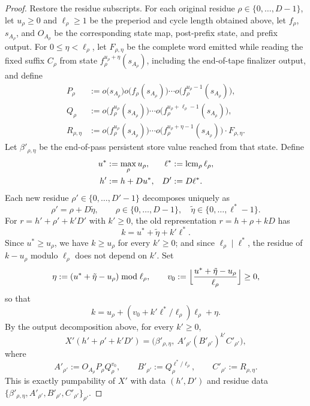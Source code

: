 \begin{proof}
Restore the residue subscripts. For each original residue
$\rho\in\{0,\ldots,D-1\}$, let $u_\rho\ge0$ and $\ell_\rho\ge1$ be the
preperiod and cycle length obtained above, let $f_\rho$, $s_{A_\rho}$, and
$O_{A_\rho}$ be the corresponding state map, post-prefix state, and prefix
output. For $0\le\eta<\ell_\rho$, let $F_{\rho,\eta}$ be the complete word
emitted while reading the fixed suffix $C_\rho$ from state
$f_\rho^{u_\rho+\eta}(s_{A_\rho})$, including the end-of-tape finalizer output,
and define
\begin{align*}
  P_\rho &:=
  o\bigl(s_{A_\rho}\bigr)o\bigl(f_\rho(s_{A_\rho})\bigr)\cdots
  o\bigl(f_\rho^{u_\rho-1}(s_{A_\rho})\bigr),\\
  Q_\rho &:=
  o\bigl(f_\rho^{u_\rho}(s_{A_\rho})\bigr)\cdots
  o\bigl(f_\rho^{u_\rho+\ell_\rho-1}(s_{A_\rho})\bigr),\\
  R_{\rho,\eta} &:=
  o\bigl(f_\rho^{u_\rho}(s_{A_\rho})\bigr)\cdots
  o\bigl(f_\rho^{u_\rho+\eta-1}(s_{A_\rho})\bigr)\cdot F_{\rho,\eta}.
\end{align*}
Let $\beta'_{\rho,\eta}$ be the end-of-pass persistent store value reached from
that state. Define
\[
\begin{aligned}
  u^*&:=\max_{\rho} u_\rho,
  &\ell^*&:=\operatorname{lcm}_{\rho}\ell_\rho,\\
  h'&:=h+D u^*,
  &D'&:=D\ell^*.
\end{aligned}
\]
Each new residue $\rho'\in\{0,\ldots,D'-1\}$ decomposes uniquely as
\[
  \rho'=\rho+D\tilde\eta,
  \qquad
  \rho\in\{0,\ldots,D-1\},\quad
  \tilde\eta\in\{0,\ldots,\ell^*-1\}.
\]
For $r=h'+\rho'+k'D'$ with $k'\ge0$, the old representation
$r=h+\rho+kD$ has
\[
  k=u^*+\tilde\eta+k'\ell^*.
\]
Since $u^*\ge u_\rho$, we have $k\ge u_\rho$ for every $k'\ge0$; and since
$\ell_\rho\mid\ell^*$, the residue of $k-u_\rho$ modulo $\ell_\rho$ does not
depend on $k'$. Set
\[
  \eta:=(u^*+\tilde\eta-u_\rho)\bmod \ell_\rho,
  \qquad
  v_0:=\Bigl\lfloor\frac{u^*+\tilde\eta-u_\rho}{\ell_\rho}\Bigr\rfloor\ge0,
\]
so that
\[
  k=u_\rho+(v_0+k'\ell^*/\ell_\rho)\ell_\rho+\eta.
\]
By the output decomposition above, for every $k'\ge0$,
\[
  X'(h'+\rho'+k'D')
  =\bigl(\beta'_{\rho,\eta},\ A'_{\rho'}(B'_{\rho'})^{k'}C'_{\rho'}\bigr),
\]
where
\[
  A'_{\rho'}:=O_{A_\rho}P_\rho Q_\rho^{v_0},
  \qquad
  B'_{\rho'}:=Q_\rho^{\ell^*/\ell_\rho},
  \qquad
  C'_{\rho'}:=R_{\rho,\eta}.
\]
This is exactly pumpability of $X'$ with data $(h',D')$ and residue data
$\{\beta'_{\rho,\eta},A'_{\rho'},B'_{\rho'},C'_{\rho'}\}_{\rho'}$.
\end{proof}

